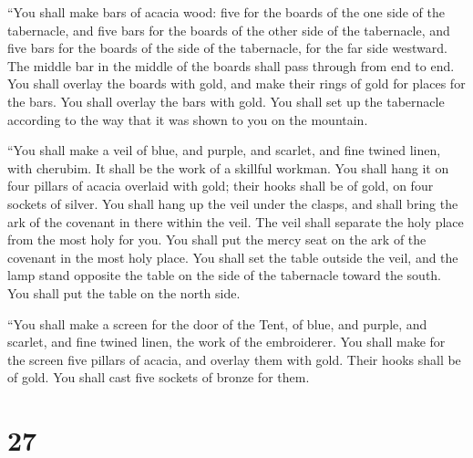  ``You shall make bars of acacia wood: five for the
boards of the one side of the tabernacle,  and five bars
for the boards of the other side of the tabernacle, and five bars for
the boards of the side of the tabernacle, for the far side westward.
 The middle bar in the middle of the boards shall pass
through from end to end.  You shall overlay the boards
with gold, and make their rings of gold for places for the bars. You
shall overlay the bars with gold.  You shall set up the
tabernacle according to the way that it was shown to you on the
mountain.

 ``You shall make a veil of blue, and purple, and
scarlet, and fine twined linen, with cherubim. It shall be the work of a
skillful workman.  You shall hang it on four pillars of
acacia overlaid with gold; their hooks shall be of gold, on four sockets
of silver.  You shall hang up the veil under the clasps,
and shall bring the ark of the covenant in there within the veil. The
veil shall separate the holy place from the most holy for you.
 You shall put the mercy seat on the ark of the covenant
in the most holy place.  You shall set the table outside
the veil, and the lamp stand opposite the table on the side of the
tabernacle toward the south. You shall put the table on the north side.

 ``You shall make a screen for the door of the Tent, of
blue, and purple, and scarlet, and fine twined linen, the work of the
embroiderer.  You shall make for the screen five pillars
of acacia, and overlay them with gold. Their hooks shall be of gold. You
shall cast five sockets of bronze for them.

\hypertarget{section-26}{%
\section{27}\label{section-26}}

